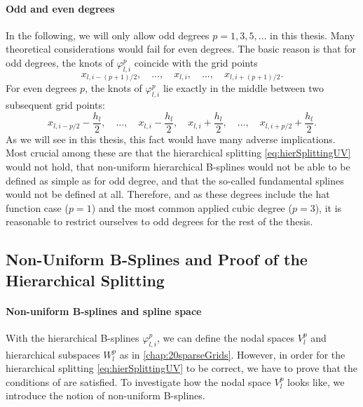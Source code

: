 \paragraph{Odd and even degrees}

In the following, we will only allow odd degrees $p = 1, 3, 5, \dotsc$
in this thesis.
Many theoretical considerations would fail for even degrees.
The basic reason is that for odd degrees, the knots of
$\varphi_{l,i}^p$ coincide with the grid points
\begin{equation}
  x_{l,i-(p+1)/2},\quad
  \dotsc,\quad
  x_{l,i},\quad
  \dotsc,\quad
  x_{l,i+(p+1)/2}.
\end{equation}
For even degrees $p$, the knots of $\varphi_{l,i}^p$ lie exactly in
the middle between two subsequent grid points:
\begin{equation}
  x_{l,i-p/2} - \frac{h_l}{2},\quad
  \dotsc,\quad
  x_{l,i} - \frac{h_l}{2},\quad
  x_{l,i} + \frac{h_l}{2},\quad
  \dotsc,\quad
  x_{l,i+p/2} + \frac{h_l}{2}.
\end{equation}
As we will see in this thesis,
this fact would have many adverse implications.
Most crucial among these are
that the hierarchical splitting \eqref{eq:hierSplittingUV} would not hold,
that non-uniform hierarchical B-splines would not be able to be defined as
simple as for odd degree,
 and
that the so-called fundamental splines would not be defined at all.
Therefore, and
as these degrees include the hat function case ($p = 1$) and the
most common applied cubic degree ($p = 3$),
it is reasonable to restrict ourselves to odd degrees
for the rest of the thesis.



\subsection{Non-Uniform B-Splines and Proof of the Hierarchical Splitting}

\paragraph{Non-uniform B-splines and spline space}

With the hierarchical B-splines $\varphi_{l,i}^p$, we can define
the nodal spaces $V_l^p$ and hierarchical subspaces $W_l^p$
as in \cref{chap:20sparseGrids}.
However, in order for the hierarchical splitting \eqref{eq:hierSplittingUV}
to be correct, we have to prove that the conditions of
 are satisfied.
To investigate how the nodal space $V_l^p$ looks like,
we introduce the notion of non-uniform B-splines.

